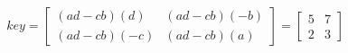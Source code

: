 \documentclass[10pt]{article}
\begin{document}
\[ key =
\left[ \begin{array}{ccc}
(ad-cb)(d) & (ad-cb)(-b)\\
(ad-cb)(-c) & (ad-cb)(a)
\end{array} \right]
=
\left[ \begin{array}{ccc}
5 & 7\\
2 & 3
\end{array} \right]

\]
\end{document}
